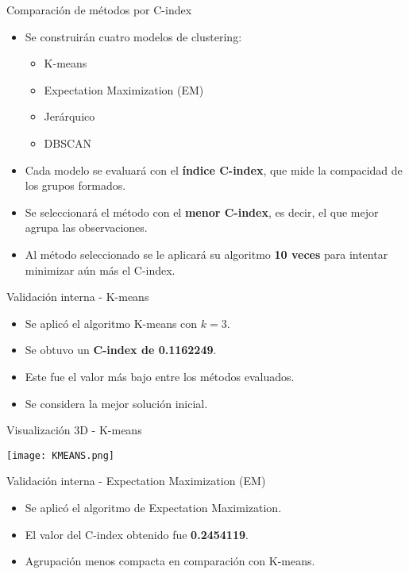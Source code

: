 \documentclass[
	11pt, %
]{beamer}
\begin{document}
\begin{frame}{Comparación de métodos por C-index}
\begin{itemize}
    \item Se construirán cuatro modelos de clustering:
    \begin{itemize}
        \item K-means
        \item Expectation Maximization (EM)
        \item Jerárquico
        \item DBSCAN
    \end{itemize}
    \item Cada modelo se evaluará con el \textbf{índice C-index}, que mide la compacidad de los grupos formados.
    \item Se seleccionará el método con el \textbf{menor C-index}, es decir, el que mejor agrupa las observaciones.
    \item Al método seleccionado se le aplicará su algoritmo \textbf{10 veces} para intentar minimizar aún más el C-index.
\end{itemize}
\end{frame}
\begin{frame}{Validación interna - K-means}
\begin{itemize}
    \item Se aplicó el algoritmo K-means con $k = 3$.
    \item Se obtuvo un \textbf{C-index de 0.1162249}.
    \item Este fue el valor más bajo entre los métodos evaluados.
    \item Se considera la mejor solución inicial.
\end{itemize}
\end{frame}

\begin{frame}{Visualización 3D - K-means}
\begin{center}
    \texttt{[image: KMEANS.png]}
\end{center}
\end{frame}

\begin{frame}{Validación interna - Expectation Maximization (EM)}
\begin{itemize}
    \item Se aplicó el algoritmo de Expectation Maximization.
    \item El valor del C-index obtenido fue \textbf{0.2454119}.
    \item Agrupación menos compacta en comparación con K-means.
\end{itemize}
\end{frame}
\end{document}
